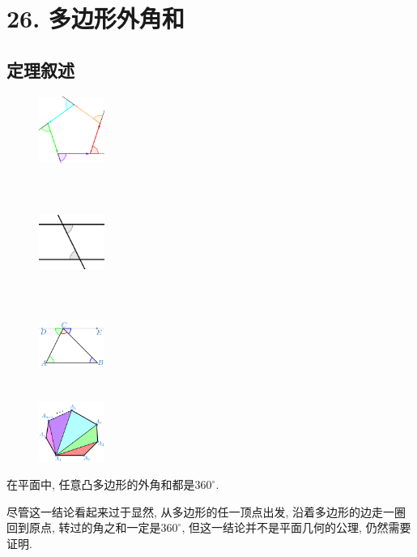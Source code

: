 \documentclass[main]{subfiles}
\begin{document}
	\renewcommand{\filename}{26. 多边形外角和}%
{\linespread{1.2}
\section{26. 多边形外角和}
\subsection{定理叙述}
	\begin{figure}
		\includegraphics[width=0.19\textwidth]{26_pentagon.png}
		~\\
		~\\
		~\\
		~\\
		\includegraphics[width=0.19\textwidth]{26_parallel_angles.png}
		~\\
		~\\
		~\\
		~\\
		\includegraphics[width=0.19\textwidth]{26_triangle_sum.png}
		~\\
		~\\
		~\\
		\includegraphics[width=0.19\textwidth]{26_triangulate_convex_polygon.png}
	\end{figure}
	在平面中, 任意凸多边形的外角和都是$360^{\circ}$.
	
	尽管这一结论看起来过于显然, 从多边形的任一顶点出发, 沿着多边形的边走一圈回到原点, 转过的角之和一定是$360^{\circ}$, 但这一结论并不是平面几何的公理, 仍然需要证明.
}
\end{document}
